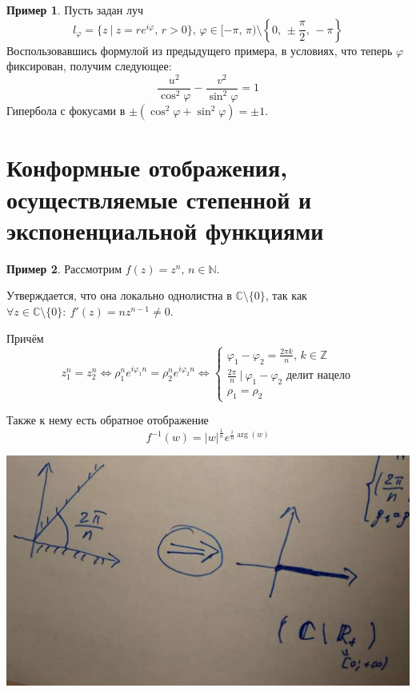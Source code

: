 \documentclass[a4paper,12pt]{article}
\renewcommand{\phi}{\ensuremath{\varphi}}
\theoremstyle{plain}
\theoremstyle{definition}
\newtheorem*{example}{Пример}
\theoremstyle{remark}
\begin{document}
\begin{example}
	Пусть задан луч
	\[
		l_\phi = \{z \:\vert\: z = re^{i\phi},\, r > 0\},\, \phi \in [-\pi,\, \pi) \setminus \left\{0,\, \pm\frac{\pi}{2},\, -\pi\right\}
	\]
	Воспользовавшись формулой из предыдущего примера, в условиях, что теперь $\phi$ фиксирован, получим следующее:
	\[
		\frac{u^2}{\cos^2\phi} - \frac{v^2}{\sin^2 \phi} = 1
	\]
	Гипербола с фокусами в $\pm(\cos^2\phi + \sin^2\phi) = \pm1$.
\end{example}

\section{Конформные отображения, осуществляемые степенной и экспоненциальной функциями}
\begin{example}
	Рассмотрим $f(z) = z^n,\, n \in \mathbb{N}$.

	Утверждается, что она локально однолистна в $\mathbb{C} \setminus \{0\}$, так как $\forall z \in \mathbb{C} \setminus \{0\} :\: f'(z) = nz^{n - 1} \neq 0$.

	Причём
	\[
		z_1^n = z_2^n \Leftrightarrow \rho_1^ne^{i\phi_1n} = \rho_2^ne^{i\phi_2n} \Leftrightarrow
		\begin{cases}
			\phi_1 - \phi_2 = \frac{2\pi k}{n},\, k \in \mathbb{Z}         \\
			\frac{2\pi}{n} \:\vert\: \phi_1 - \phi_2 \text{  делит нацело} \\
			\rho_1 = \rho_2
		\end{cases}
	\]

	Также к нему есть обратное отображение
	\[
		f^{-1}(w) = \vert w\vert^{\frac{1}{n}}e^{\frac{i}{n}\arg(w)}
	\]

	\includegraphics[scale=0.3]{assets/power_ex.png}
\end{example}
\end{document}
